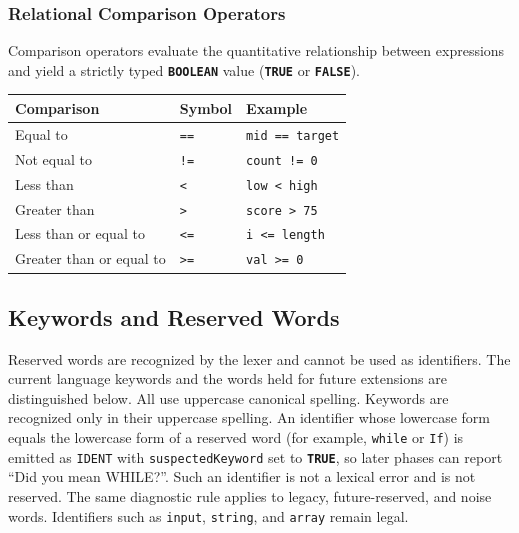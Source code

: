 \documentclass[11pt,a4paper]{article}
\newcommand{\kw}[1]{\texttt{\bfseries\color{pupmaroon}#1}}
\newcommand{\token}[1]{\texttt{#1}}
\newcommand{\codeinline}[1]{\texttt{#1}}
\begin{document}
\subsubsection{Relational Comparison Operators}

Comparison operators evaluate the quantitative relationship between expressions and yield a strictly typed \kw{BOOLEAN} value (\kw{TRUE} or \kw{FALSE}).

\begin{table}[htbp]
\centering
\begin{tabularx}{0.85\linewidth}{Y L{25mm} Y}
\toprule
\textbf{Comparison} & \textbf{Symbol} & \textbf{Example} \\
\midrule
Equal to & \codeinline{==} & \codeinline{mid == target} \\
Not equal to & \codeinline{!=} & \codeinline{count != 0} \\
Less than & \codeinline{<} & \codeinline{low < high} \\
Greater than & \codeinline{>} & \codeinline{score > 75} \\
Less than or equal to & \codeinline{<=} & \codeinline{i <= length} \\
Greater than or equal to & \codeinline{>=} & \codeinline{val >= 0} \\
\bottomrule
\end{tabularx}
\end{table}

\subsection{Keywords and Reserved Words}

Reserved words are recognized by the lexer and cannot be used as identifiers. The current language keywords and the words held for future extensions are distinguished below. All use uppercase canonical spelling. Keywords are recognized only in their uppercase spelling. An identifier whose lowercase form equals the lowercase form of a reserved word (for example, \codeinline{while} or \codeinline{If}) is emitted as \token{IDENT} with \codeinline{suspectedKeyword} set to \kw{TRUE}, so later phases can report ``Did you mean WHILE?''. Such an identifier is not a lexical error and is not reserved. The same diagnostic rule applies to legacy, future-reserved, and noise words. Identifiers such as \codeinline{input}, \codeinline{string}, and \codeinline{array} remain legal.
\end{document}
